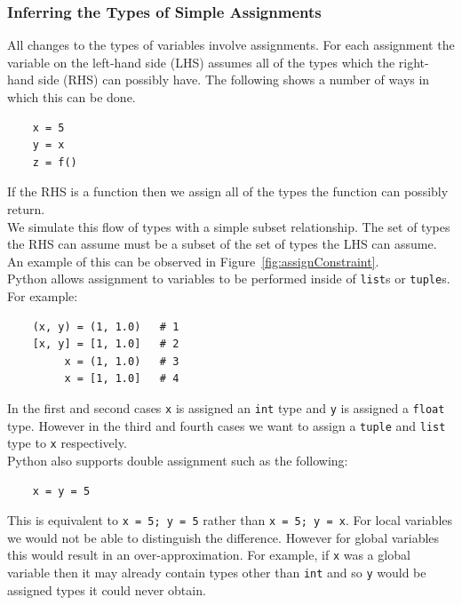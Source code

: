 \documentclass[12pt, titlepage]{article}
\begin{document}
\subsubsection{Inferring the Types of Simple Assignments}
All changes to the types of variables involve assignments. For each assignment the variable on the left-hand side (LHS) assumes all of the types which the right-hand side (RHS) can possibly have. The following shows a number of ways in which this can be done.
\begin{lstlisting}
	x = 5
	y = x
	z = f()
\end{lstlisting}
 If the RHS is a function then we assign all of the types the function can possibly return. \\
\indent We simulate this flow of types with a simple subset relationship. The set of types the RHS can assume must be a subset of the set of types the LHS can assume. An example of this can be observed in Figure~\ref{fig:assignConstraint}. \\
\indent Python allows assignment to variables to be performed inside of \texttt{list}s or \texttt{tuple}s. For example:
\begin{lstlisting}
    (x, y) = (1, 1.0)   # 1
    [x, y] = [1, 1.0]   # 2
         x = (1, 1.0)   # 3
         x = [1, 1.0]   # 4
\end{lstlisting}
In the first and second cases \texttt{x} is assigned an \texttt{int} type and \texttt{y} is assigned a \texttt{float} type. However in the third and fourth cases we want to assign a \texttt{tuple} and \texttt{list} type to \texttt{x} respectively. \\
\indent Python also supports double assignment such as the following:
\begin{lstlisting}
    x = y = 5
\end{lstlisting}
This is equivalent to \texttt{x = 5; y = 5} rather than \texttt{x = 5; y = x}. For local variables we would not be able to distinguish the difference. However for global variables this would result in an over-approximation. For example, if \texttt{x} was a global variable then it may already contain types other than \texttt{int} and so \texttt{y} would be assigned types it could never obtain.
\end{document}
